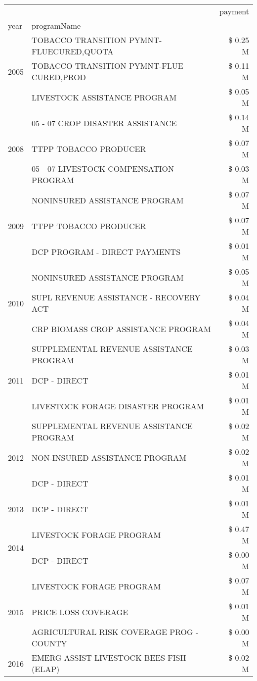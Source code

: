 \begin{tabular}{llr}
\toprule
 &  & payment \\
year & programName &  \\
\midrule
\multirow[t]{3}{*}{2005} & TOBACCO TRANSITION PYMNT-FLUECURED,QUOTA & \$ 0.25 M \\
 & TOBACCO TRANSITION PYMNT-FLUE CURED,PROD & \$ 0.11 M \\
 & LIVESTOCK ASSISTANCE PROGRAM & \$ 0.05 M \\
\cline{1-3}
\multirow[t]{3}{*}{2008} & 05 - 07 CROP DISASTER ASSISTANCE & \$ 0.14 M \\
 & TTPP TOBACCO PRODUCER & \$ 0.07 M \\
 & 05 - 07 LIVESTOCK COMPENSATION PROGRAM & \$ 0.03 M \\
\cline{1-3}
\multirow[t]{3}{*}{2009} & NONINSURED ASSISTANCE PROGRAM & \$ 0.07 M \\
 & TTPP TOBACCO PRODUCER & \$ 0.07 M \\
 & DCP PROGRAM - DIRECT PAYMENTS & \$ 0.01 M \\
\cline{1-3}
\multirow[t]{3}{*}{2010} & NONINSURED ASSISTANCE PROGRAM & \$ 0.05 M \\
 & SUPL REVENUE ASSISTANCE - RECOVERY ACT & \$ 0.04 M \\
 & CRP BIOMASS CROP ASSISTANCE PROGRAM & \$ 0.04 M \\
\cline{1-3}
\multirow[t]{3}{*}{2011} & SUPPLEMENTAL REVENUE ASSISTANCE PROGRAM & \$ 0.03 M \\
 & DCP - DIRECT & \$ 0.01 M \\
 & LIVESTOCK FORAGE DISASTER PROGRAM & \$ 0.01 M \\
\cline{1-3}
\multirow[t]{3}{*}{2012} & SUPPLEMENTAL REVENUE ASSISTANCE PROGRAM & \$ 0.02 M \\
 & NON-INSURED ASSISTANCE PROGRAM & \$ 0.02 M \\
 & DCP - DIRECT & \$ 0.01 M \\
\cline{1-3}
2013 & DCP - DIRECT & \$ 0.01 M \\
\cline{1-3}
\multirow[t]{2}{*}{2014} & LIVESTOCK FORAGE PROGRAM & \$ 0.47 M \\
 & DCP - DIRECT & \$ 0.00 M \\
\cline{1-3}
\multirow[t]{3}{*}{2015} & LIVESTOCK FORAGE PROGRAM & \$ 0.07 M \\
 & PRICE LOSS COVERAGE & \$ 0.01 M \\
 & AGRICULTURAL RISK COVERAGE PROG - COUNTY & \$ 0.00 M \\
\cline{1-3}
\multirow[t]{3}{*}{2016} & EMERG ASSIST LIVESTOCK BEES FISH (ELAP) & \$ 0.02 M \\

\end{tabular}
